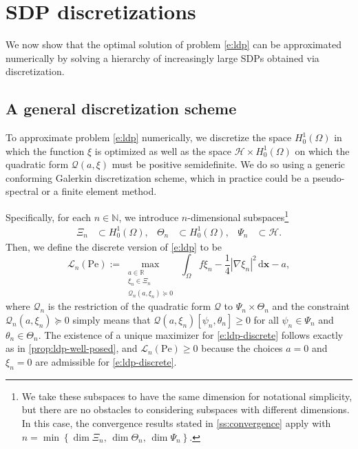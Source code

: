 \documentclass[a4paper, 10pt]{amsart}
\numberwithin{equation}{section}
\theoremstyle{plain}
\theoremstyle{definition}
\theoremstyle{remark}
\newcommand{\cal}[1]{\mathcal{#1}}
\newcommand{\R}{\mathbb{R}}
\newcommand{\N}{\mathbb{N}}
\newcommand{\Pe}{\mathrm{Pe}}
\newcommand{\Hoz}{H_0^1(\Omega)}
\newcommand{\QF}{\mathcal{Q}}
\renewcommand{\vec}[1]{\mathbf{#1}}
\newcommand{\abs}[1]{\left\vert #1 \right\vert}
\newcommand{\dx}{\mathrm{d} \vec{x}}
\newcommand{\avg}[1]{\int_\Omega #1 \,\dx}
\newcommand{\lb}{\mathcal{L}}
\begin{document}
\section{SDP discretizations}\label{s:discretization}

We now show that the optimal solution of problem \cref{e:ldp} can be approximated numerically by solving a hierarchy of increasingly large SDPs obtained via discretization.

\subsection{A general discretization scheme}
To approximate problem \cref{e:ldp} numerically, we discretize the space $\Hoz$ in which the function $\xi$ is optimized as well as the space $\cal{H}\times \Hoz$ on which the quadratic form $\QF(a,\xi)$ must be positive semidefinite. We do so using a generic conforming Galerkin discretization scheme, which in practice could be a pseudo-spectral or a finite element method.

Specifically, for each $n \in \N$, we introduce $n$-dimensional subspaces\footnote{We take these subspaces to have the same dimension for notational simplicity, but there are no obstacles to considering subspaces with different dimensions. In this case, the convergence results stated in \cref{ss:convergence} apply with $n = \min\left\{\dim \Xi_n,\, \dim \Theta_n,\, \dim \Psi_n \right\}$.}
\begin{align*}
    \Xi_n &\subset \Hoz, &
    \Theta_n &\subset \Hoz, &
    \Psi_n &\subset \cal{H}.
\end{align*}
Then, we define the discrete version of \cref{e:ldp} to be
\begin{equation}\label{e:ldp-discrete}
    \lb_n(\Pe) := \max_{\substack{a\in\R \\ \xi_n \in \Xi_n \\ \QF_n(a,\xi_n)\succeq 0}} \
    \avg{f\xi_n - \frac14 \abs{\nabla \xi_n}^2} - a,
\end{equation}
where $\QF_n$ is the restriction of the quadratic form $\QF$ to $\Psi_n \times \Theta_n$ and the constraint $\QF_n(a,\xi_n)\succeq 0$ simply means that $\QF(a,\xi_n)[\psi_n, \theta_n]\geq 0$ for all $\psi_n \in \Psi_n$ and $\theta_n \in \Theta_n$. The existence of a unique maximizer for \cref{e:ldp-discrete} follows exactly as in \cref{prop:ldp-well-posed}, and $\lb_n(\Pe)\geq 0$ because the choices $a=0$ and $\xi_n = 0$ are admissible for \cref{e:ldp-discrete}.
\end{document}
